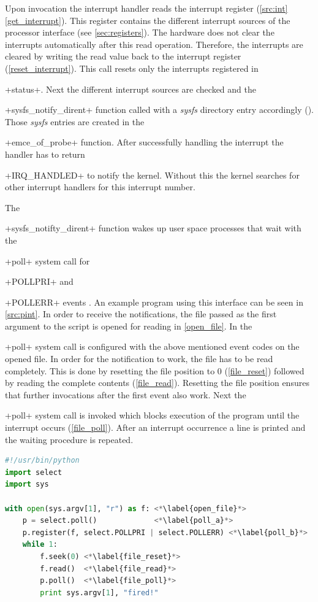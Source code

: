 \documentclass[12pt,a4paper,parskip=full,abstract=true,BCOR=12mm,twoside,open=right]{scrreprt}
\newcommand{\hack}{}
\newcommand*{\SavedLstInline}{}
\DeclareRobustCommand*{\lstinline}{%
  \ifmmode
    \let\SavedBGroup\bgroup
    \def\bgroup{%
      \let\bgroup\SavedBGroup
      \hbox\bgroup
    }%
  \fi
  \SavedLstInline
}
\def\device#1{\mbox{\textit{#1}}}
\begin{document}
Upon invocation the interrupt handler reads the interrupt register
(\cref{src:int} \cref{get_interrupt}). This register contains the
different interrupt sources of the processor interface (see
\cref{sec:registers}). The hardware does not clear the interrupts
automatically after this read operation. Therefore, the interrupts are cleared
by writing the read value back to the interrupt register
(\cref{reset_interrupt}). This call resets only the interrupts registered
in \lstinline+status+. Next the different interrupt sources are checked
and the \lstinline+sysfs_notify_dirent+ function called with a \device{sysfs}
directory entry accordingly (). Those
\device{sysfs} entries are created in the \lstinline+emce_of_probe+
function. After successfully handling the interrupt the handler has to
return \lstinline+IRQ_HANDLED+ to notify the kernel. Without this the
kernel searches for other interrupt handlers for this interrupt number.

The \lstinline+sysfs_notifty_dirent+ function wakes up user space processes
that wait with the \lstinline+poll+ system call for \lstinline+POLLPRI+ and
\lstinline+POLLERR+ events \cite{posix}. An example program using this interface
can be seen in \cref{src:pint}. In order to receive the notifications,
the file passed as the first argument to the script is opened for reading in
\cref{open_file}. In  the \lstinline+poll+ system call
is configured with the above mentioned event codes on the opened file. In order for
the notification to work, the file has to be read completely. This is done by
resetting the file position to 0 (\cref{file_reset}) followed by reading the
complete contents (\cref{file_read}). Resetting the file position ensures that
further invocations after the first event also work. Next the \lstinline+poll+
system call is invoked which blocks execution of the program until the
interrupt occurs (\cref{file_poll}). After an interrupt occurrence a line is
printed and the waiting procedure is repeated.

\begin{lstlisting}[language=python,float=htb,caption={Wait for interrupt example in python},label=src:pint,basicstyle=\hack\scriptsize]
#!/usr/bin/python
import select
import sys

with open(sys.argv[1], "r") as f: <*\label{open_file}*>
    p = select.poll()             <*\label{poll_a}*>
    p.register(f, select.POLLPRI | select.POLLERR) <*\label{poll_b}*>
    while 1:
        f.seek(0) <*\label{file_reset}*>
        f.read()  <*\label{file_read}*>
        p.poll()  <*\label{file_poll}*>
        print sys.argv[1], "fired!"
\end{lstlisting}
\end{document}
